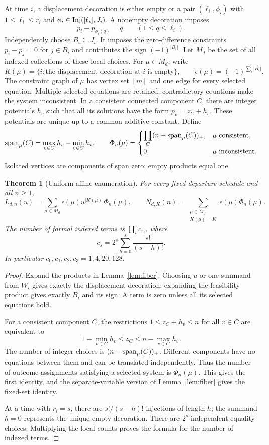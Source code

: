 \documentclass[11pt,a4paper]{article}
\newtheorem{theorem}{Theorem}[section]\newtheorem{lemma}[theorem]{Lemma}\newtheorem{corollary}[theorem]{Corollary}\newtheorem{proposition}[theorem]{Proposition}\theoremstyle{remark}\newtheorem{remark}[theorem]{Remark}\newtheorem{example}[theorem]{Example}
\begin{document}
At time $i$, a displacement decoration is either empty or a pair
$(\ell_i,\phi_i)$ with $1\le\ell_i\le r_i$ and
$\phi_i\in\operatorname{Inj}([\ell_i],J_i)$.  A nonempty decoration imposes
\[
 p_i-p_{\phi_i(q)}=q\qquad(1\le q\le\ell_i).
\]
Independently choose $B_i\subseteq J_i$.  It imposes the zero-difference
constraints $p_i-p_j=0$ for $j\in B_i$ and contributes the sign
$(-1)^{|B_i|}$.  Let $M_d$ be the set of all indexed collections of these
local choices.  For $\mu\in M_d$, write
\[
 K(\mu)=\{i:\text{the displacement decoration at $i$ is empty}\},
 \qquad \epsilon(\mu)=(-1)^{\sum_i|B_i|}.
\]
The constraint graph of $\mu$ has vertex set $[m]$ and one edge for every
selected equation.  Multiple selected equations are retained: contradictory
equations make the system inconsistent.  In a consistent connected component
$C$, there are integer potentials $h_v$ such that all its solutions have the
form $p_v=z_C+h_v$.  These potentials are unique up to a common additive
constant.  Define
\[
 \operatorname{span}_\mu(C)=\max_{v\in C}h_v-\min_{v\in C}h_v,
 \qquad
 \Phi_n(\mu)=
 \begin{cases}
  \displaystyle\prod_C(n-\operatorname{span}_\mu(C))_+,&\mu\text{ consistent},\\
  0,&\mu\text{ inconsistent}.
 \end{cases}
\]
Isolated vertices are components of span zero; empty products equal one.

\begin{theorem}[Uniform affine enumeration]\label{thm:affine}
For every fixed departure schedule and all $n\ge1$,
\[
 L_{d,n}(u)=\sum_{\mu\in M_d}\epsilon(\mu)u^{|K(\mu)|}\Phi_n(\mu),
 \qquad
 N_{d,K}(n)=\sum_{\substack{\mu\in M_d\\K(\mu)=K}}
                    \epsilon(\mu)\Phi_n(\mu).
\]
The number of formal indexed terms is $\prod_i c_{r_i}$, where
\[
 c_s=2^s\sum_{h=0}^s\frac{s!}{(s-h)!}.
\]
In particular $c_0,c_1,c_2,c_3=1,4,20,128$.
\end{theorem}
\begin{proof}
Expand the products in Lemma~\ref{lem:fiber}.  Choosing $u$ or one summand
from $W_i$ gives exactly the displacement decoration; expanding the
feasibility product gives exactly $B_i$ and its sign.  A term is zero unless
all its selected equations hold.

For a consistent component $C$, the restrictions $1\le z_C+h_v\le n$ for
all $v\in C$ are equivalent to
\[
 1-\min_{v\in C}h_v\le z_C\le n-\max_{v\in C}h_v.
\]
The number of integer choices is $(n-\operatorname{span}_\mu(C))_+$.  Different components
have no equations between them and can be translated independently.
Thus the number of outcome assignments satisfying a selected system is
$\Phi_n(\mu)$.  This gives the first identity, and the separate-variable
version of Lemma~\ref{lem:fiber} gives the fixed-set identity.

At a time with $r_i=s$, there are $s!/(s-h)!$ injections of length $h$;
the summand $h=0$ represents the unique empty decoration.  There are
$2^s$ independent equality choices.  Multiplying the local counts proves
the formula for the number of indexed terms.
\end{proof}
\end{document}
